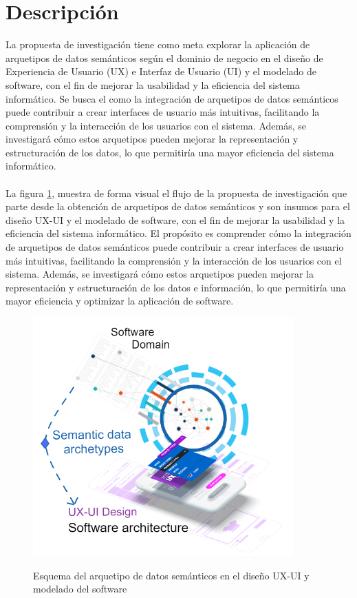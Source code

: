 \documentclass[12pt,a4paper]{article}
\begin{document}
\section{Descripción}
\label{sec:Description}
La propuesta de investigación tiene como meta explorar la aplicación de arquetipos de datos semánticos según el dominio de negocio en el diseño de Experiencia de Usuario (UX) e Interfaz de Usuario (UI) y el modelado de software, con el fin de mejorar la usabilidad y la eficiencia del sistema informático. Se busca el como la integración de arquetipos de datos semánticos puede contribuir a crear interfaces de usuario más intuitivas, facilitando la comprensión y la interacción de los usuarios con el sistema. Además, se investigará cómo estos arquetipos pueden mejorar la representación y estructuración de los datos, lo que permitiría una mayor eficiencia del sistema informático.
\\\\
La figura \ref{fig:figDescripcion}, muestra de forma visual el flujo de la propuesta de investigación que parte desde la obtención de arquetipos de datos semánticos y son insumos para el diseño UX-UI y el modelado de software, con el fin de mejorar la usabilidad y la eficiencia del sistema informático. El propósito es comprender cómo la integración de arquetipos de datos semánticos puede contribuir a crear interfaces de usuario más intuitivas, facilitando la comprensión y la interacción de los usuarios con el sistema. Además, se investigará cómo estos arquetipos pueden mejorar la representación y estructuración de los datos e información, lo que permitiría una mayor eficiencia y optimizar la aplicación de software.
\\
\begin{figure}[htb]
  \centering
  {\includegraphics[clip=true,trim= 0cm 0cm 0cm 0cm, width=10cm]{Figuras/figDescripcion.png}}
  \caption{Esquema del arquetipo de datos semánticos en el diseño UX-UI y modelado del software}
  \label{fig:figDescripcion}
\end{figure}
\end{document}
